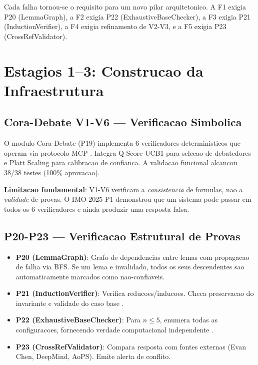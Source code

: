 \documentclass[5p]{elsarticle}
\begin{document}
Cada falha tornou-se o requisito para um novo pilar arquitetonico. A F1 exigia
P20 (LemmaGraph), a F2 exigia P22 (ExhaustiveBaseChecker), a F3 exigia P21
(InductionVerifier), a F4 exigia refinamento de V2-V3, e a F5 exigia P23
(CrossRefValidator).

\section{Estagios 1--3: Construcao da Infraestrutura}

\subsection{Cora-Debate V1-V6 — Verificacao Simbolica}

O modulo Cora-Debate (P19) implementa 6 verificadores deterministicos que operam
via protocolo MCP \cite{cora2026}. Integra Q-Score UCB1 \cite{auer2002} para
selecao de debatedores e Platt Scaling \cite{platt1999,guo2017} para calibracao
de confianca. A validacao funcional alcancou 38/38 testes (100\% aprovacao).

\textbf{Limitacao fundamental}: V1-V6 verificam a \textit{consistencia} de
formulas, nao a \textit{validade} de provas. O IMO 2025 P1 demonstrou que um
sistema pode passar em todos os 6 verificadores e ainda produzir uma resposta
falsa.

\subsection{P20-P23 — Verificacao Estrutural de Provas}

\begin{itemize}
  \item \textbf{P20 (LemmaGraph)}: Grafo de dependencias entre lemas com
    propagacao de falha via BFS. Se um lema e invalidado, todos os seus
    descendentes sao automaticamente marcados como nao-confiaveis.
  \item \textbf{P21 (InductionVerifier)}: Verifica reducoes/inducoes. Checa
    preservacao do invariante e validade do caso base \cite{burstall1969,hoare1969}.
  \item \textbf{P22 (ExhaustiveBaseChecker)}: Para $n\leq 5$, enumera todas as
    configuracoes, fornecendo verdade computacional independente \cite{clarke1999}.
  \item \textbf{P23 (CrossRefValidator)}: Compara resposta com fontes externas
    (Evan Chen, DeepMind, AoPS). Emite alerta de conflito.
\end{itemize}
\end{document}
